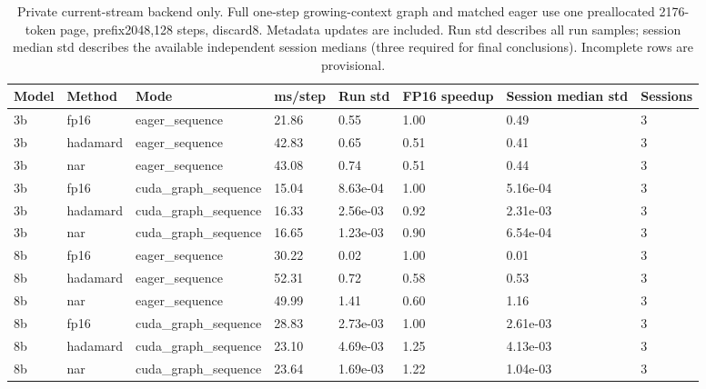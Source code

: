 \begin{table}[t]
\centering
\small
\caption{Private current-stream backend only. Full one-step growing-context graph and matched eager use one preallocated 2176-token page, prefix2048,128 steps, discard8. Metadata updates are included. Run std describes all run samples; session median std describes the available independent session medians (three required for final conclusions). Incomplete rows are provisional.}
\begin{tabular}{llllllll}
\toprule
Model & Method & Mode & ms/step & Run std & FP16 speedup & Session median std & Sessions \\
\midrule
3b & fp16 & eager\_sequence & 21.86 & 0.55 & 1.00 & 0.49 & 3 \\
3b & hadamard & eager\_sequence & 42.83 & 0.65 & 0.51 & 0.41 & 3 \\
3b & nar & eager\_sequence & 43.08 & 0.74 & 0.51 & 0.44 & 3 \\
3b & fp16 & cuda\_graph\_sequence & 15.04 & 8.63e-04 & 1.00 & 5.16e-04 & 3 \\
3b & hadamard & cuda\_graph\_sequence & 16.33 & 2.56e-03 & 0.92 & 2.31e-03 & 3 \\
3b & nar & cuda\_graph\_sequence & 16.65 & 1.23e-03 & 0.90 & 6.54e-04 & 3 \\
8b & fp16 & eager\_sequence & 30.22 & 0.02 & 1.00 & 0.01 & 3 \\
8b & hadamard & eager\_sequence & 52.31 & 0.72 & 0.58 & 0.53 & 3 \\
8b & nar & eager\_sequence & 49.99 & 1.41 & 0.60 & 1.16 & 3 \\
8b & fp16 & cuda\_graph\_sequence & 28.83 & 2.73e-03 & 1.00 & 2.61e-03 & 3 \\
8b & hadamard & cuda\_graph\_sequence & 23.10 & 4.69e-03 & 1.25 & 4.13e-03 & 3 \\
8b & nar & cuda\_graph\_sequence & 23.64 & 1.69e-03 & 1.22 & 1.04e-03 & 3 \\
\bottomrule
\end{tabular}
\end{table}
